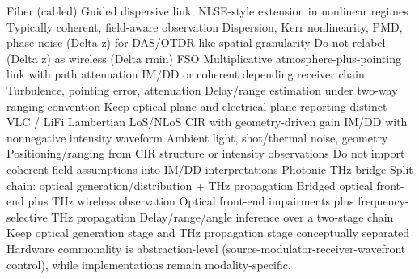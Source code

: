 {}\markdownRendererPipe{} Fiber (cabled) \markdownRendererPipe{} Guided dispersive link; NLSE-style extension in nonlinear regimes \markdownRendererPipe{} Typically coherent, field-aware observation \markdownRendererPipe{} Dispersion, Kerr nonlinearity, PMD, phase noise \markdownRendererPipe{} (\markdownRendererBackslash{}Delta z) for DAS/OTDR-like spatial granularity \markdownRendererPipe{} Do not relabel (\markdownRendererBackslash{}Delta z) as wireless (\markdownRendererBackslash{}Delta r\markdownRendererUnderscore{}\markdownRendererLeftBrace{}\markdownRendererBackslash{}min\markdownRendererRightBrace{}) \markdownRendererPipe{}\markdownRendererSoftLineBreak
{}\markdownRendererPipe{} FSO \markdownRendererPipe{} Multiplicative atmosphere-plus-pointing link with path attenuation \markdownRendererPipe{} IM/DD or coherent depending receiver chain \markdownRendererPipe{} Turbulence, pointing error, attenuation \markdownRendererPipe{} Delay/range estimation under two-way ranging convention \markdownRendererPipe{} Keep optical-plane and electrical-plane reporting distinct \markdownRendererPipe{}\markdownRendererSoftLineBreak
{}\markdownRendererPipe{} VLC / LiFi \markdownRendererPipe{} Lambertian LoS/NLoS CIR with geometry-driven gain \markdownRendererPipe{} IM/DD with nonnegative intensity waveform \markdownRendererPipe{} Ambient light, shot/thermal noise, geometry \markdownRendererPipe{} Positioning/ranging from CIR structure or intensity observations \markdownRendererPipe{} Do not import coherent-field assumptions into IM/DD interpretations \markdownRendererPipe{}\markdownRendererSoftLineBreak
{}\markdownRendererPipe{} Photonic-THz bridge \markdownRendererPipe{} Split chain: optical generation/distribution + THz propagation \markdownRendererPipe{} Bridged optical front-end plus THz wireless observation \markdownRendererPipe{} Optical front-end impairments plus frequency-selective THz propagation \markdownRendererPipe{} Delay/range/angle inference over a two-stage chain \markdownRendererPipe{} Keep optical generation stage and THz propagation stage conceptually separated \markdownRendererPipe{}\markdownRendererParagraphSeparator
{} Hardware commonality is abstraction-level (source-modulator-receiver-wavefront control), while implementations remain modality-specific.\markdownRendererInterblockSeparator
{}\markdownRendererThematicBreak{}\markdownRendererInterblockSeparator
{}
\markdownRendererSectionEnd 
\markdownRendererSectionEnd \markdownRendererSectionBegin
{}\markdownRendererInterblockSeparator
